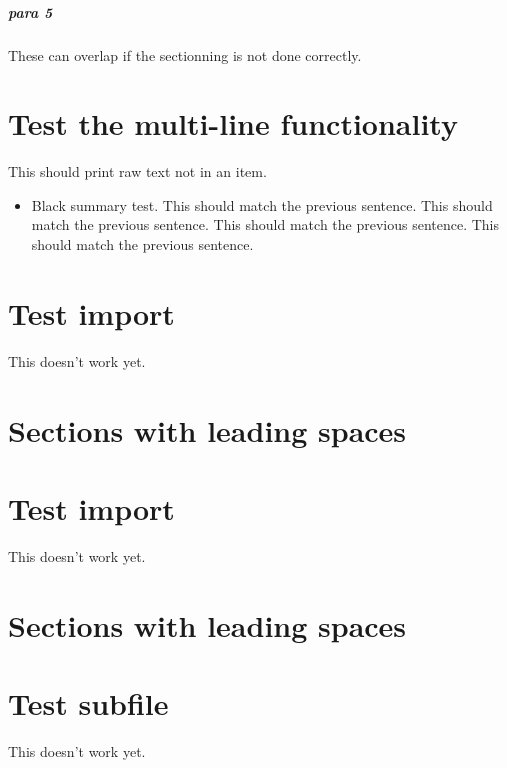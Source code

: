\paragraph{para 5}
\label{autosec:7}
These can overlap if the sectionning is not done correctly.
\chapter{Test the multi-line functionality}
\label{autosec:7}
This should print raw text not in an item.
    \begin{itemize}[noitemsep]
        \item Black summary test.
This should match the previous sentence.
This should match the previous sentence.
This should match the previous sentence.
This should match the previous sentence.
    \end{itemize}
\chapter{Test import}
\label{autosec:8}
This doesn't work yet.
\chapter{Sections with leading spaces}
\label{autosec:9}
\vspace{-36pt}\hspace{11pt}
\chapter{Test import}
\label{autosec:10}
This doesn't work yet.
\chapter{Sections with leading spaces}
\label{autosec:11}
\vspace{-36pt}\hspace{11pt}
\chapter{Test subfile}
\label{autosec:12}
This doesn't work yet.


